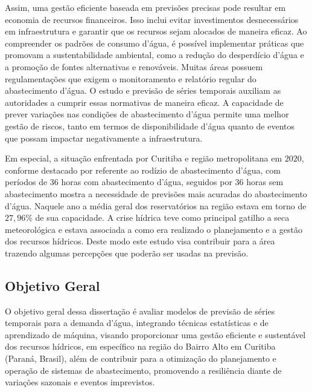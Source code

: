Assim, uma gestão eficiente baseada em previsões precisas pode resultar em economia de recursos financeiros. Isso inclui evitar investimentos desnecessários em infraestrutura e garantir que os recursos sejam alocados de maneira eficaz. Ao compreender os padrões de consumo d'água, é possível implementar práticas que promovam a sustentabilidade ambiental, como a redução do desperdício d'água e a promoção de fontes alternativas e renováveis. Muitas áreas possuem regulamentações que exigem o monitoramento e relatório regular do abastecimento d'água. O estudo e previsão de séries temporais auxiliam as autoridades a cumprir essas normativas de maneira eficaz. A capacidade de prever variações nas condições de abastecimento d'água permite uma melhor gestão de riscos, tanto em termos de disponibilidade d'água quanto de eventos que possam impactar negativamente a infraestrutura.

Em especial, a situação enfrentada por Curitiba e região metropolitana em $2020$, conforme destacado por \cite{vasconcelos_2020} referente ao rodízio de abastecimento d'água, com períodos de 36 horas com abastecimento d'água, seguidos por 36 horas sem abastecimento mostra a necessidade de previsões mais acuradas do abastecimento d'água. Naquele ano a média geral dos reservatórios na região estava em torno de $27,96\%$ de sua capacidade. A crise hídrica teve como principal gatilho a seca meteorológica e estava associada a como era realizado o planejamento e a gestão dos recursos hídricos. Deste modo este estudo visa contribuir para a área trazendo algumas percepções que poderão ser usadas na previsão.

\subsection{Objetivo Geral} \label{subsec:objetivos}

O objetivo geral dessa dissertação é avaliar modelos de previsão de séries temporais para a demanda d'água, integrando técnicas estatísticas e de aprendizado de máquina, visando proporcionar uma gestão eficiente e sustentável dos recursos hídricos, em específico na região do Bairro Alto em Curitiba (Paraná, Brasil), além de contribuir para a otimização do planejamento e operação de sistemas de abastecimento, promovendo a resiliência diante de variações sazonais e eventos imprevistos.

